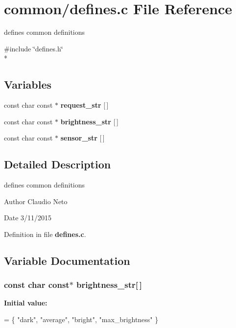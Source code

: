 \section{common/defines.c File Reference}
\label{defines_8c}


defines common definitions  


{\ttfamily \#include \char`\"{}defines.\-h\char`\"{}}\\*
\subsection*{Variables}
\begin{DoxyCompactItemize}
\item 
const char const $\ast$ {\bf request\-\_\-str} [$\,$]
\item 
const char const $\ast$ {\bf brightness\-\_\-str} [$\,$]
\item 
const char const $\ast$ {\bf sensor\-\_\-str} [$\,$]
\end{DoxyCompactItemize}


\subsection{Detailed Description}
defines common definitions \begin{DoxyAuthor}{Author}
Claudio Neto
\end{DoxyAuthor}
\begin{DoxyDate}{Date}
3/11/2015 
\end{DoxyDate}


Definition in file {\bf defines.\-c}.



\subsection{Variable Documentation}
\subsubsection[{brightness\-\_\-str}]{\setlength{\rightskip}{0pt plus 5cm}const char const$\ast$ brightness\-\_\-str[$\,$]}\label{defines_8c_aa66266408de980f8f70d74c36e24ef9c}
{\bfseries Initial value\-:}
\begin{DoxyCode}
= \{
    \textcolor{stringliteral}{"dark"},
    \textcolor{stringliteral}{"average"},
    \textcolor{stringliteral}{"bright"},
    \textcolor{stringliteral}{"max\_brightness"}
\}
\end{DoxyCode}


